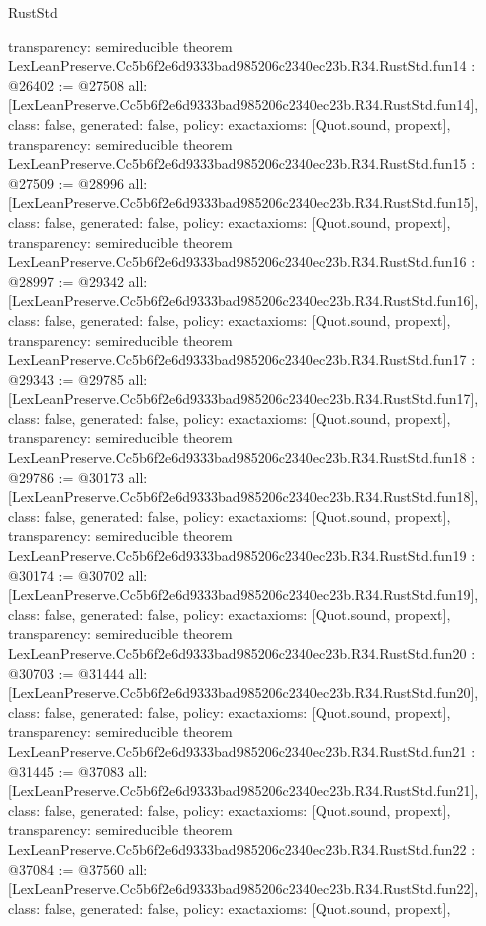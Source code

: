 \begin{lexlean}{RustStd}
\begin{coremodule}
{  transparency: semireducible
}
theorem LexLeanPreserve.Cc5b6f2e6d9333bad985206c2340ec23b.R34.RustStd.fun14 : @26402 := @27508 {
  all: [LexLeanPreserve.Cc5b6f2e6d9333bad985206c2340ec23b.R34.RustStd.fun14],
  class: false,
  generated: false,
  policy: exact{axioms: [Quot.sound, propext]},
  transparency: semireducible
}
theorem LexLeanPreserve.Cc5b6f2e6d9333bad985206c2340ec23b.R34.RustStd.fun15 : @27509 := @28996 {
  all: [LexLeanPreserve.Cc5b6f2e6d9333bad985206c2340ec23b.R34.RustStd.fun15],
  class: false,
  generated: false,
  policy: exact{axioms: [Quot.sound, propext]},
  transparency: semireducible
}
theorem LexLeanPreserve.Cc5b6f2e6d9333bad985206c2340ec23b.R34.RustStd.fun16 : @28997 := @29342 {
  all: [LexLeanPreserve.Cc5b6f2e6d9333bad985206c2340ec23b.R34.RustStd.fun16],
  class: false,
  generated: false,
  policy: exact{axioms: [Quot.sound, propext]},
  transparency: semireducible
}
theorem LexLeanPreserve.Cc5b6f2e6d9333bad985206c2340ec23b.R34.RustStd.fun17 : @29343 := @29785 {
  all: [LexLeanPreserve.Cc5b6f2e6d9333bad985206c2340ec23b.R34.RustStd.fun17],
  class: false,
  generated: false,
  policy: exact{axioms: [Quot.sound, propext]},
  transparency: semireducible
}
theorem LexLeanPreserve.Cc5b6f2e6d9333bad985206c2340ec23b.R34.RustStd.fun18 : @29786 := @30173 {
  all: [LexLeanPreserve.Cc5b6f2e6d9333bad985206c2340ec23b.R34.RustStd.fun18],
  class: false,
  generated: false,
  policy: exact{axioms: [Quot.sound, propext]},
  transparency: semireducible
}
theorem LexLeanPreserve.Cc5b6f2e6d9333bad985206c2340ec23b.R34.RustStd.fun19 : @30174 := @30702 {
  all: [LexLeanPreserve.Cc5b6f2e6d9333bad985206c2340ec23b.R34.RustStd.fun19],
  class: false,
  generated: false,
  policy: exact{axioms: [Quot.sound, propext]},
  transparency: semireducible
}
theorem LexLeanPreserve.Cc5b6f2e6d9333bad985206c2340ec23b.R34.RustStd.fun20 : @30703 := @31444 {
  all: [LexLeanPreserve.Cc5b6f2e6d9333bad985206c2340ec23b.R34.RustStd.fun20],
  class: false,
  generated: false,
  policy: exact{axioms: [Quot.sound, propext]},
  transparency: semireducible
}
theorem LexLeanPreserve.Cc5b6f2e6d9333bad985206c2340ec23b.R34.RustStd.fun21 : @31445 := @37083 {
  all: [LexLeanPreserve.Cc5b6f2e6d9333bad985206c2340ec23b.R34.RustStd.fun21],
  class: false,
  generated: false,
  policy: exact{axioms: [Quot.sound, propext]},
  transparency: semireducible
}
theorem LexLeanPreserve.Cc5b6f2e6d9333bad985206c2340ec23b.R34.RustStd.fun22 : @37084 := @37560 {
  all: [LexLeanPreserve.Cc5b6f2e6d9333bad985206c2340ec23b.R34.RustStd.fun22],
  class: false,
  generated: false,
  policy: exact{axioms: [Quot.sound, propext]},
}
\end{coremodule}
\end{lexlean}
